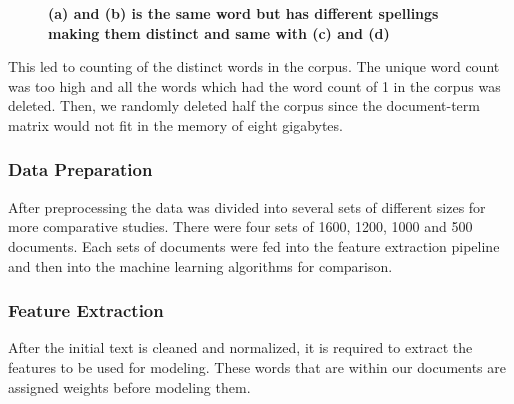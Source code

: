 \documentclass[12pt]{report}
\begin{document}
            \begin{figure}[h]
                \centering



                \caption{\textbf{(a) and (b) is the same word but has different spellings making them distinct and same with (c) and (d)}}
             \end{figure}

            This led to counting of the distinct words in the corpus. The unique word count was too high and all the words which had the
            word count of 1 in the corpus was deleted. Then, we randomly deleted half the corpus since the document-term matrix would not
            fit in the memory of eight gigabytes.


            \subsubsection{Data Preparation}

            After preprocessing the data was divided into several sets of different sizes for more comparative studies. There were four sets of 1600, 1200, 1000 and 500 documents.
            Each sets of documents were fed into the feature extraction pipeline and then into the machine learning algorithms for comparison.


        \subsubsection{Feature Extraction}
        After the initial text is cleaned and normalized, it is required to extract the features to be used for modeling.
        These words that are within our documents are assigned weights before modeling them.
\end{document}
